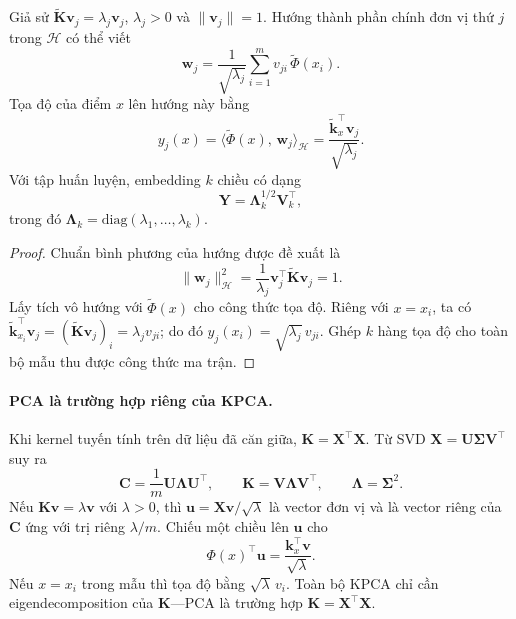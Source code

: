 \begin{theorem}
\label{thm:kpca-coord}
Giả sử $\widetilde{\mathbf{K}}\mathbf{v}_j = \lambda_j \mathbf{v}_j$, $\lambda_j > 0$ và $\|\mathbf{v}_j\| = 1$. Hướng thành phần chính đơn vị thứ $j$ trong $\mathcal{H}$ có thể viết
\[
\mathbf{w}_j = \frac{1}{\sqrt{\lambda_j}}\sum_{i=1}^m v_{ji}\,\widetilde{\Phi}(x_i).
\]
Tọa độ của điểm $x$ lên hướng này bằng
\[
y_j(x) = \langle\widetilde{\Phi}(x),\,\mathbf{w}_j\rangle_{\mathcal{H}}
= \frac{\widetilde{\mathbf{k}}_x^\top \mathbf{v}_j}{\sqrt{\lambda_j}}.
\]
Với tập huấn luyện, embedding $k$ chiều có dạng
\[
\mathbf{Y} = \boldsymbol{\Lambda}_k^{1/2}\mathbf{V}_k^\top,
\]
trong đó $\boldsymbol{\Lambda}_k = \mathrm{diag}(\lambda_1,\ldots,\lambda_k)$.
\end{theorem}

\begin{proof}
Chuẩn bình phương của hướng được đề xuất là
\[
\|\mathbf{w}_j\|_{\mathcal{H}}^2
= \frac{1}{\lambda_j}\mathbf{v}_j^\top\widetilde{\mathbf{K}}\mathbf{v}_j = 1.
\]
Lấy tích vô hướng với $\widetilde{\Phi}(x)$ cho công thức tọa độ. Riêng với $x = x_i$, ta có $\widetilde{\mathbf{k}}_{x_i}^\top\mathbf{v}_j = (\widetilde{\mathbf{K}}\mathbf{v}_j)_i = \lambda_j v_{ji}$; do đó $y_j(x_i) = \sqrt{\lambda_j}\,v_{ji}$. Ghép $k$ hàng tọa độ cho toàn bộ mẫu thu được công thức ma trận.
\end{proof}

\paragraph{PCA là trường hợp riêng của KPCA.}
Khi kernel tuyến tính trên dữ liệu đã căn giữa, $\mathbf{K} = \mathbf{X}^\top\mathbf{X}$. Từ SVD $\mathbf{X} = \mathbf{U}\boldsymbol{\Sigma}\mathbf{V}^\top$ suy ra
\begin{equation}
\mathbf{C} = \frac{1}{m}\mathbf{U}\boldsymbol{\Lambda}\mathbf{U}^\top,
\qquad
\mathbf{K} = \mathbf{V}\boldsymbol{\Lambda}\mathbf{V}^\top,
\qquad
\boldsymbol{\Lambda} = \boldsymbol{\Sigma}^2.
\label{eq:svd-relation}
\end{equation}
Nếu $\mathbf{K}\mathbf{v} = \lambda\mathbf{v}$ với $\lambda > 0$, thì $\mathbf{u} = \mathbf{X}\mathbf{v}/\sqrt{\lambda}$ là vector đơn vị và là vector riêng của $\mathbf{C}$ ứng với trị riêng $\lambda/m$. Chiếu một chiều lên $\mathbf{u}$ cho
\begin{equation}
\Phi(x)^\top \mathbf{u}
= \frac{\mathbf{k}_x^\top \mathbf{v}}{\sqrt{\lambda}}.
\label{eq:kpca-projection}
\end{equation}
Nếu $x = x_i$ trong mẫu thì tọa độ bằng $\sqrt{\lambda}\,v_i$. Toàn bộ KPCA chỉ cần eigendecomposition của $\mathbf{K}$---PCA là trường hợp $\mathbf{K} = \mathbf{X}^\top\mathbf{X}$.

